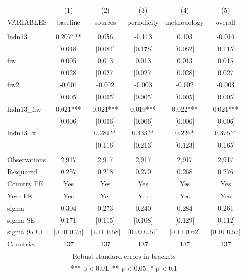 \begin{tabular}{lccccc} \hline
 & (1) & (2) & (3) & (4) & (5) \\
VARIABLES & baseline & sources & periodicity & methodology & overall \\ \hline
 &  &  &  &  &  \\
lndn13 & 0.207*** & 0.056 & -0.113 & 0.103 & -0.010 \\
 & [0.048] & [0.084] & [0.178] & [0.082] & [0.115] \\
fiw & 0.005 & 0.013 & 0.013 & 0.013 & 0.015 \\
 & [0.028] & [0.027] & [0.027] & [0.028] & [0.027] \\
fiw2 & -0.001 & -0.002 & -0.003 & -0.002 & -0.003 \\
 & [0.005] & [0.005] & [0.005] & [0.005] & [0.005] \\
lndn13\_fiw & 0.021*** & 0.021*** & 0.019*** & 0.022*** & 0.021*** \\
 & [0.006] & [0.006] & [0.006] & [0.006] & [0.006] \\
lndn13\_x &  & 0.280** & 0.433** & 0.226* & 0.375** \\
 &  & [0.116] & [0.213] & [0.123] & [0.165] \\
 &  &  &  &  &  \\
Observations & 2,917 & 2,917 & 2,917 & 2,917 & 2,917 \\
R-squared & 0.257 & 0.278 & 0.270 & 0.268 & 0.276 \\
Country FE & Yes & Yes & Yes & Yes & Yes \\
Year FE & Yes & Yes & Yes & Yes & Yes \\
sigma & 0.304 & 0.273 & 0.240 & 0.284 & 0.261 \\
sigma SE & [0.171] & [0.115] & [0.108] & [0.129] & [0.112] \\
sigma 95 CI & [0.10 0.75] & [0.11 0.58] & [0.09 0.51] & [0.11 0.62] & [0.10 0.57] \\
 Countries & 137 & 137 & 137 & 137 & 137 \\ \hline
\multicolumn{6}{c}{ Robust standard errors in brackets} \\
\multicolumn{6}{c}{ *** p$<$0.01, ** p$<$0.05, * p$<$0.1} \\
\end{tabular}

